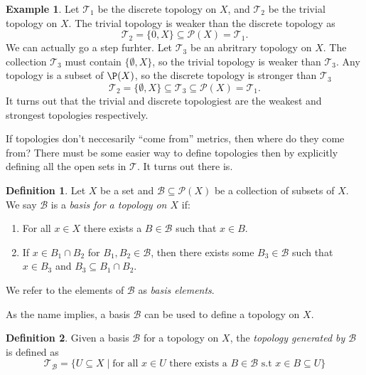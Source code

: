 \documentclass{article}
\newcommand{\T}{\mathcal{T}}
\theoremstyle{definition}
\newtheorem{definition}{Definition}[section]
\newtheorem{example}{Example}[section]
\begin{document}
	\begin{example}
	 Let $\T_1$ be the discrete topology on $X$, and $\T_2$ be the trivial topology on $X$. The trivial topology is weaker than the discrete topology as 
	 $$ \T_2 = \{0,X\}\subseteq \mathcal P(X) = \T_1.$$ 
	 We can actually go a step furhter. Let $\T_3$ be an abritrary topology on $X$. The collection $\T_3$ must contain $\{\emptyset, X\}$, so the trivial topology is weaker than $\T_3$.  Any topology is a subset of $\P(X)$, so the discrete topology is stronger than $\T_3$
	 $$ \T_2 = \{\emptyset, X\} \subseteq \T_3 \subseteq \mathcal P(X) = \T_1.$$
	 It turns out that the trivial and discrete topologiest are the weakest and strongest topologies respectively. 
	\end{example}
	 

	If topologies don't neccesarily ``come from'' metrics, then where do they come from? There must be some easier way to define topologies then by explicitly defining all the open sets in $\T$.  It turns out there is.
	
	\begin{definition}\label{def13.11}
		Let $X$ be a set and $\mathscr B\subseteq \mathcal P(X)$ be a collection of subsets of $X$. We say $\mathscr B$ is a \textit{\color{red}basis for a topology on $X$} if:
		\begin{enumerate}
			\item For all $x\in X$ there exists a $B\in\mathscr B$ such that $x\in B$.
			\item If $x\in B_1\cap B_2$ for $B_1,B_2\in\mathscr B$, then there exists some $B_3\in\mathscr B$ such that $x\in B_3$ and $B_3\subseteq B_1\cap B_2$.
		\end{enumerate}
	We refer to the elements of $\mathscr B$ as \textit{\color{red}basis elements}. 
	\end{definition}

	As the name implies, a basis $\mathscr B$ can be used to define a topology on $X$. 
	
	\begin{definition}\label{def13.12}
		Given a basis $\mathscr B$ for a topology on $X$, the \textit{\color{red}topology generated by $\mathscr B$} is defined as 
		$$ \T_{\mathscr B} =\{U\subseteq X\mid \text{for all }x\in U\text{ there exists a }B\in\mathscr B\text{ s.t }x\in B\subseteq U\}$$
	\end{definition}
\end{document}
